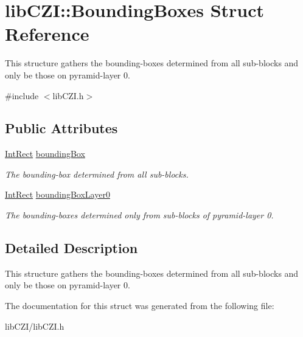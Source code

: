\hypertarget{structlib_c_z_i_1_1_bounding_boxes}{}\section{lib\+C\+ZI\+:\+:Bounding\+Boxes Struct Reference}
\label{structlib_c_z_i_1_1_bounding_boxes}


This structure gathers the bounding-\/boxes determined from all sub-\/blocks and only be those on pyramid-\/layer 0.  




{\ttfamily \#include $<$lib\+C\+Z\+I.\+h$>$}

\subsection*{Public Attributes}
\begin{DoxyCompactItemize}
\item 
\mbox{\label{structlib_c_z_i_1_1_bounding_boxes_abc2beea033eba496b26cbfdb4b16ced6}} 
\hyperlink{structlib_c_z_i_1_1_int_rect}{Int\+Rect} \hyperlink{structlib_c_z_i_1_1_bounding_boxes_abc2beea033eba496b26cbfdb4b16ced6}{bounding\+Box}
\begin{DoxyCompactList}\small\item\em The bounding-\/box determined from all sub-\/blocks. \end{DoxyCompactList}\item 
\mbox{\label{structlib_c_z_i_1_1_bounding_boxes_a6e0e45a2c8bc35fe10463437dc8b9509}} 
\hyperlink{structlib_c_z_i_1_1_int_rect}{Int\+Rect} \hyperlink{structlib_c_z_i_1_1_bounding_boxes_a6e0e45a2c8bc35fe10463437dc8b9509}{bounding\+Box\+Layer0}
\begin{DoxyCompactList}\small\item\em The bounding-\/boxes determined only from sub-\/blocks of pyramid-\/layer 0. \end{DoxyCompactList}\end{DoxyCompactItemize}


\subsection{Detailed Description}
This structure gathers the bounding-\/boxes determined from all sub-\/blocks and only be those on pyramid-\/layer 0. 

The documentation for this struct was generated from the following file\+:\begin{DoxyCompactItemize}
\item 
lib\+C\+Z\+I/lib\+C\+Z\+I.\+h\end{DoxyCompactItemize}
